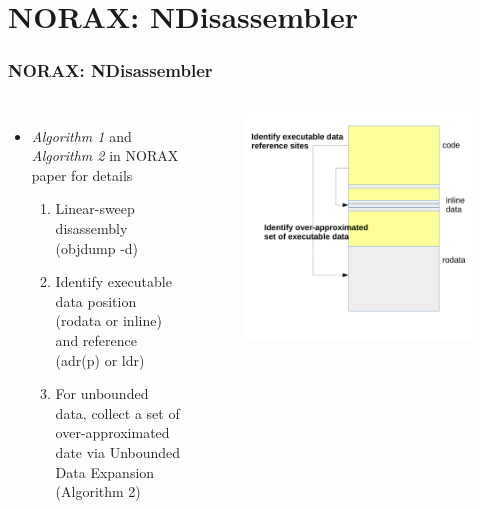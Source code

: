 \documentclass[aspectratio=169]{beamer}
\begin{document}

\section{NORAX: NDisassembler}
\begin{frame}
\frametitle{NORAX: NDisassembler}
\begin{columns}[c]
\begin{itemize}
\item \textit{Algorithm 1} and \textit{Algorithm 2} in NORAX paper for details
\begin{enumerate}
\item Linear-sweep disassembly (objdump -d)
\item Identify executable data position (rodata or inline) and reference (adr(p) or ldr)
\item For unbounded data, collect a set of over-approximated date via Unbounded Data Expansion (Algorithm 2)
\end{enumerate}
\end{itemize}
\begin{figure}
\includegraphics[width=1.0\linewidth]{figures/ndisassembler.pdf}
\end{figure}
\end{columns}
\end{frame}
\end{document}
